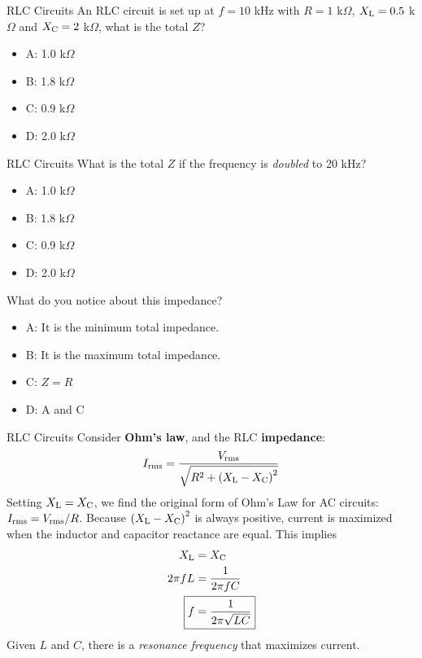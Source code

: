 \documentclass{beamer}
\begin{document}
\begin{frame}{RLC Circuits}
An RLC circuit is set up at $f = 10$ kHz with $R = 1$ k$\Omega$, $X_{\rm L} = 0.5$ k$\Omega$ and $X_{\rm C} = 2$ k$\Omega$, what is the total $Z$?
\begin{itemize}
\item A: 1.0 k$\Omega$
\item B: 1.8 k$\Omega$
\item C: 0.9 k$\Omega$
\item D: 2.0 k$\Omega$
\end{itemize}
\end{frame}

\begin{frame}{RLC Circuits}
What is the total $Z$ if the frequency is \textit{doubled} to 20 kHz?
\begin{itemize}
\item A: 1.0 k$\Omega$
\item B: 1.8 k$\Omega$
\item C: 0.9 k$\Omega$
\item D: 2.0 k$\Omega$
\end{itemize}
What do you notice about this impedance?
\begin{itemize}
\item A: It is the minimum total impedance.
\item B: It is the maximum total impedance.
\item C: $Z = R$
\item D: A and C
\end{itemize}
\end{frame}

\begin{frame}{RLC Circuits}
\small
Consider \textbf{\alert{Ohm's law}}, and the RLC \textbf{\alert{impedance}}:
\begin{equation}
I_{\rm rms} = \frac{V_{\rm rms}}{\sqrt{R^2 + \left(X_{\rm L} - X_{\rm C} \right)^2}}
\end{equation}
Setting $X_{\rm L} = X_{\rm C}$, we find the original form of Ohm's Law for AC circuits: $I_{\rm rms} = V_{\rm rms}/R$.  Because $\left(X_{\rm L} - X_{\rm C} \right)^2$ is always positive, current is maximized when the inductor and capacitor reactance are equal.  This implies
\begin{align}
X_{\rm L} &= X_{\rm C} \\
2\pi f L &= \frac{1}{2\pi f C} \\
\Aboxed{f &= \frac{1}{2\pi\sqrt{LC}}}
\end{align}
Given $L$ and $C$, there is a \textit{resonance frequency} that maximizes current.
\end{frame}
\end{document}
